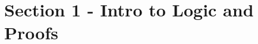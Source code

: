 \documentclass[../../Main.tex]{subfiles}
\begin{document}
\chapter{Section 1 - Intro to Logic and Proofs}


\setcounter{section}{2} %



\setcounter{section}{6} %


\end{document}
